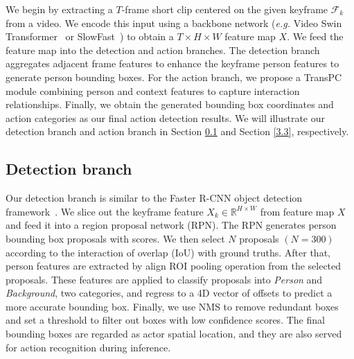 \documentclass[final]{cvpr}
\begin{document}
We begin by extracting a $T$-frame short clip centered on the given keyframe $\mathcal{F}_k$ from a video. We encode this input using a backbone network (\emph{e.g.} Video Swin Transformer~\cite{DBLP:journals/corr/abs-2106-13230} or SlowFast~\cite{feichtenhofer2019slowfast}) to obtain a $T\times H\times W$ feature map $X$.  
We feed the feature map into the detection and action branches. The detection branch aggregates adjacent frame features to enhance the keyframe person features to generate person bounding boxes. For the action branch, we propose a TransPC module combining person and context features to capture interaction relationships. Finally, we obtain the generated bounding box coordinates and action categories as our final action detection results. We will illustrate our detection branch and 
action branch in Section \ref{3.2} and Section \ref{3.3}, respectively.

\subsection{Detection branch}
\label{3.2}
Our detection branch is similar to the Faster R-CNN object detection framework~\cite{DBLP:journals/pami/RenHG017}. We slice out the keyframe feature $X_k\in \mathbb{R}^{H\times W}$ from feature map $X$ and feed it into a region proposal network (RPN). The RPN generates person bounding box proposals with scores. We then select $N$ proposals $(N=300)$ according to the interaction of overlap (IoU) with ground truths. After that, person features are extracted by align ROI pooling operation from the selected proposals. These features are applied to classify proposals into \textit{Person} and \textit{Background}, two categories, and regress to a 4D vector of offsets to predict a more accurate bounding box. Finally, we use NMS to remove redundant boxes and set a threshold to filter out boxes with low confidence scores.  The final bounding boxes are regarded as actor spatial location, and they are also served for action recognition during inference.
\vspace{-3mm}
\end{document}
